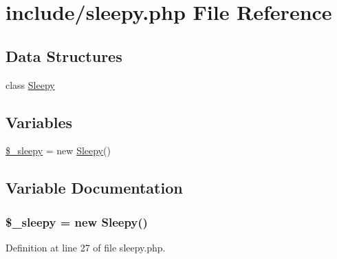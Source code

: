 \hypertarget{sleepy_8php}{\section{include/sleepy.php File Reference}
\label{sleepy_8php}
}
\subsection*{Data Structures}
\begin{DoxyCompactItemize}
\item 
class \hyperlink{class_sleepy}{Sleepy}
\end{DoxyCompactItemize}
\subsection*{Variables}
\begin{DoxyCompactItemize}
\item 
\hyperlink{sleepy_8php_a1b81bc59aa35aa47690249e597b5c682}{\$\-\_\-sleepy} = new \hyperlink{class_sleepy}{Sleepy}()
\end{DoxyCompactItemize}


\subsection{Variable Documentation}
\hypertarget{sleepy_8php_a1b81bc59aa35aa47690249e597b5c682}{
\subsubsection[{\$\-\_\-sleepy}]{\setlength{\rightskip}{0pt plus 5cm}\$\-\_\-sleepy = new {\bf Sleepy}()}}\label{sleepy_8php_a1b81bc59aa35aa47690249e597b5c682}


Definition at line 27 of file sleepy.\-php.

